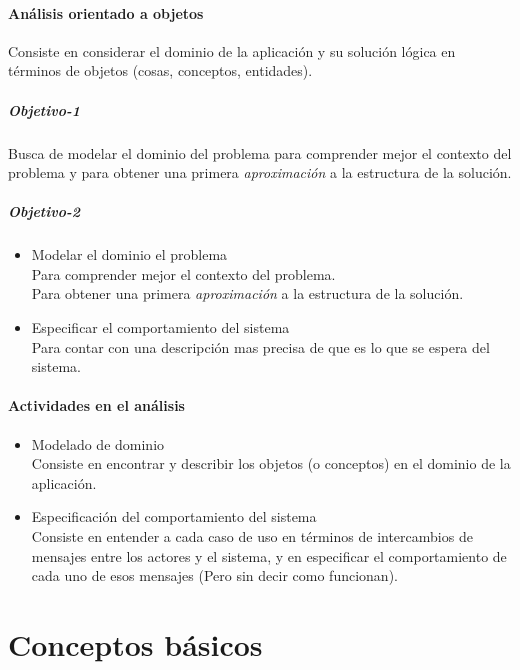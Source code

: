 \documentclass[a4paper,12pt,oneside]{report}
\begin{document}
        \paragraph{An\'alisis orientado a objetos}
          Consiste en considerar el dominio de la aplicaci\'on y su soluci\'on l\'ogica en t\'erminos de objetos (cosas, conceptos, entidades).

          \subparagraph{Objetivo-1}
            Busca de modelar el dominio del problema para comprender mejor el contexto del problema y para obtener una primera \emph{aproximaci\'on} a la estructura de la soluci\'on.

          \subparagraph{Objetivo-2}
            \begin{itemize}
              \item Modelar el dominio el problema\\
                    Para comprender mejor el contexto del problema.\\
                    Para obtener una primera \emph{aproximaci\'on} a la estructura de la soluci\'on.
              \item Especificar el comportamiento del sistema\\
                    Para contar con una descripci\'on mas precisa de que es lo que se espera del sistema.
            \end{itemize}

        \paragraph{Actividades en el an\'alisis}
          \begin{itemize}
            \item Modelado de dominio\\
                  Consiste en encontrar y describir los objetos (o conceptos) en el dominio de la aplicaci\'on.
            \item Especificaci\'on del comportamiento del sistema\\
                  Consiste en entender a cada caso de uso en t\'erminos de intercambios de mensajes entre los actores y el sistema, y en especificar el comportamiento de cada uno de esos mensajes (Pero sin decir como funcionan).
          \end{itemize}


    \section{Conceptos b\'asicos}
\end{document}
